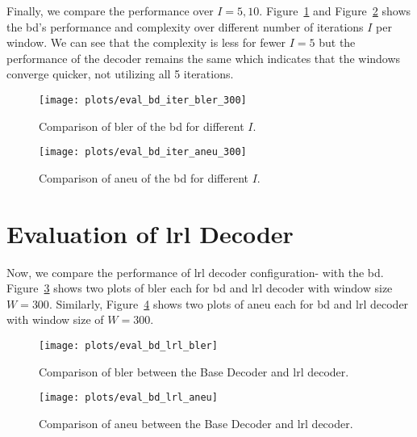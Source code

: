 Finally, we compare the performance over $I=5,10$. Figure~\ref{fig:eval_bd_iter_bler_300} and Figure~\ref{fig:eval_bd_iter_aneu_300} shows the \gls{bd}'s performance and complexity over different number of iterations $I$ per window. We can see that the complexity is less for fewer $I=5$ but the performance of the decoder remains the same which indicates that the windows converge quicker, not utilizing all 5 iterations.
\begin{figure}[htbp]
  \centering
  \texttt{[image: plots/eval\_bd\_iter\_bler\_300]}
  \caption{Comparison of \gls{bler} of the \acrfull{bd} for different $I$.}
  \label{fig:eval_bd_iter_bler_300}
\end{figure}
\begin{figure}[htbp]
  \centering
  \texttt{[image: plots/eval\_bd\_iter\_aneu\_300]}
  \caption{Comparison of \gls{aneu} of the \acrfull{bd} for different $I$.}
  \label{fig:eval_bd_iter_aneu_300}
\end{figure}

\section{Evaluation of \acrlong{lrl} Decoder}
Now, we compare the performance of \gls{lrl} decoder configuration- with the \gls{bd}. Figure~\ref{fig:eval_bd_lrl_bler} shows two plots of \gls{bler} each for \gls{bd} and \gls{lrl} decoder with window size $W=300$. Similarly, Figure~\ref{fig:eval_bd_lrl_aneu} shows two plots of \gls{aneu} each for \gls{bd} and \gls{lrl} decoder with window size of $W=300$.
\begin{figure}[htbp]
  \centering
  \texttt{[image: plots/eval\_bd\_lrl\_bler]}
  \caption{Comparison of \gls{bler} between the Base Decoder and \gls{lrl} decoder.}
  \label{fig:eval_bd_lrl_bler}
\end{figure}
\begin{figure}[htbp]
  \centering
  \texttt{[image: plots/eval\_bd\_lrl\_aneu]}
  \caption{Comparison of \gls{aneu} between the Base Decoder and \gls{lrl} decoder.}
  \label{fig:eval_bd_lrl_aneu}
\end{figure}

